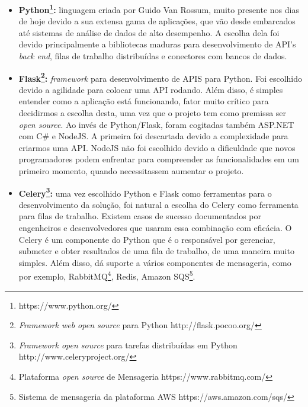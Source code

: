 \documentclass[11pt,twoside]{article}
\begin{document}
\begin{itemize}
  \item \textbf{Python\footnote{https://www.python.org/}:} linguagem criada por Guido Van Rossum, muito presente nos dias de hoje devido a sua extensa gama de aplicações, que vão desde embarcados até sistemas de análise de dados de alto 
  desempenho. A escolha dela foi devido principalmente a bibliotecas maduras para desenvolvimento de API's \emph{back end}, filas de trabalho distribuídas e conectores com bancos de dados.

  \item \textbf{Flask\footnote{\emph{Framework web open source} para Python http://flask.pocoo.org/}:} \emph{framework} para desenvolvimento de APIS para Python. Foi escolhido devido a agilidade para colocar uma API rodando. Além disso, é simples entender como a aplicação está funcionando,
  fator muito crítico para decidirmos a escolha desta, uma vez que o projeto tem como premissa ser \emph{open source}. Ao invés de Python/Flask, foram cogitadas também ASP.NET
  com C\# e NodeJS. A primeira foi descartada devido a complexidade para criarmos uma API. NodeJS não foi escolhido devido a dificuldade que novos programadores podem enfrentar para compreender as
  funcionalidades em um primeiro momento, quando necessitassem aumentar o projeto.

  \item \textbf{Celery\footnote{\emph{Framework open source} para tarefas distribuídas em Python http://www.celeryproject.org/}:} uma vez escolhido Python e Flask como ferramentas para o desenvolvimento da solução, foi natural a escolha do Celery como ferramenta para filas de trabalho. Existem
  casos de sucesso documentados por engenheiros e desenvolvedores que usaram essa combinação com eficácia. O Celery é um componente do Python que é o responsável por gerenciar, submeter e obter
  resultados de uma fila de trabalho, de uma maneira muito simples. Além disso, dá suporte a vários componentes de mensageria, como por exemplo, RabbitMQ\footnote{Plataforma \emph{open source} de Mensageria https://www.rabbitmq.com/}, 
  Redis, Amazon SQS\footnote{Sistema de mensageria da plataforma AWS https://aws.amazon.com/sqs/}.  


\end{itemize}
\end{document}
